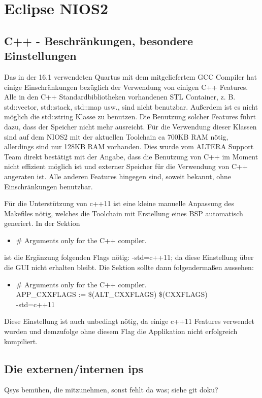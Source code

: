 \chapter{Eclipse NIOS2}
\section{C++ - Beschränkungen, besondere Einstellungen}
Das in der 16.1 verwendeten Quartus mit dem mitgeliefertem GCC Compiler hat einige Einschränkungen bezüglich der Verwendung von einigen C++ Features. Alle in den C++ Standardbibliotheken vorhandenen STL Container, z. B. std::vector, std::stack, std::map usw., sind nicht benutzbar. Außerdem ist es nicht möglich die std::string Klasse zu benutzen. Die Benutzung solcher Features führt dazu, dass der Speicher nicht mehr ausreicht. Für die Verwendung dieser Klassen sind auf dem NIOS2 mit der aktuellen Toolchain ca 700KB RAM nötig, allerdings sind nur 128KB RAM vorhanden. Dies wurde vom ALTERA Support Team direkt bestätigt mit der Angabe, dass die Benutzung von C++ im Moment nicht effizient möglich ist und externer Speicher für die Verwendung von C++ angeraten ist. Alle anderen Features hingegen sind, soweit bekannt, ohne Einschränkungen benutzbar.

Für die Unterstützung von c++11 ist eine kleine manuelle Anpassung des Makefiles nötig, welches die Toolchain mit Erstellung eines BSP automatisch generiert. In der Sektion
\begin{itemize}
 \item \# Arguments only for the C++ compiler.
\end{itemize}
ist die Ergänzung folgenden Flags nötig: -std=c++11; da diese Einstellung über die GUI nicht erhalten bleibt. Die Sektion sollte dann folgendermaßen aussehen:
\begin{itemize}
 \item \# Arguments only for the C++ compiler.\\APP\_CXXFLAGS := \$(ALT\_CXXFLAGS) \$(CXXFLAGS) \ \\-std=c++11
\end{itemize}
Diese Einstellung ist auch unbedingt nötig, da einige c++11 Features verwendet wurden und demzufolge ohne diesem Flag die Applikation nicht erfolgreich kompiliert.

\section{Die externen/internen ips}
Qsys bemühen, die mitzunehmen, sonst fehlt da was; siehe git doku?

